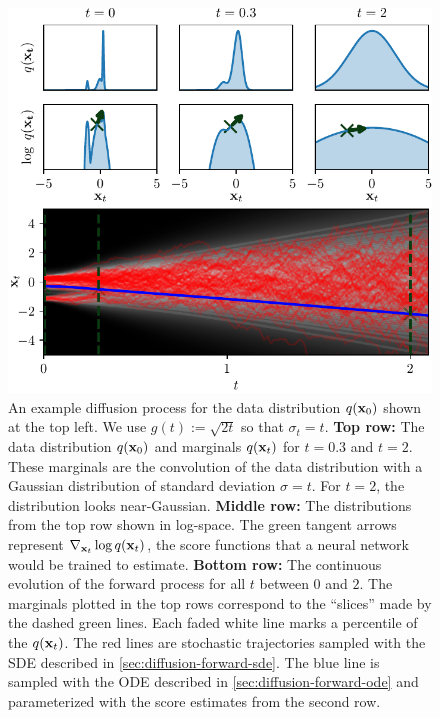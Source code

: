 \begin{figure}
    \centering
    \includegraphics[scale=1]{figs/thesis/diffusion_process.pdf}
    \caption{An example diffusion process for the data distribution $q({\mathbf{x}}_0)$ shown at the top left. We use $g(t) := \sqrt{2t}$ so that $\sigma_t = t$. \textbf{Top row:} The data distribution $q({\mathbf{x}}_0)$ and marginals $q({\mathbf{x}}_t)$ for $t=0.3$ and $t=2$. These marginals are the convolution of the data distribution with a Gaussian distribution of standard deviation $\sigma = t$. For $t=2$, the distribution looks near-Gaussian. \textbf{Middle row:} The distributions from the top row shown in log-space. The green tangent arrows represent $\nabla_{{\mathbf{x}}_t} \log q({\mathbf{x}}_t)$, the score functions that a neural network would be trained to estimate. \textbf{Bottom row:} The continuous evolution of the forward process for all $t$ between $0$ and $2$. The marginals plotted in the top rows correspond to the ``slices'' made by the dashed green lines. Each faded white line marks a percentile of the $q({\mathbf{x}}_t)$. The red lines are stochastic trajectories sampled with the SDE described in \cref{sec:diffusion-forward-sde}. The blue line is sampled with the ODE described in \cref{sec:diffusion-forward-ode} and parameterized with the score estimates from the second row.}
    \label{fig:diffusion-overview}
\end{figure}

